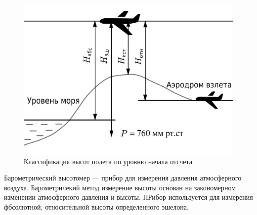 \documentclass[pract, och, master]{SCWorks}
\begin{document}
\begin{figure}[!ht]
	\centering
	\includegraphics[width=12cm]{img/baromMeasure.png}
	\caption{\label{baromMeasure}%
	Классификация высот полета по уровню начала отсчета}
\end{figure}

Барометрический высотомер --- прибор для измерения давления атмосферного воздуха. Барометричекий метод измерение высоты 
основан на закономерном изменении атмосферного давления и высоты. ПРибор используется для измерения фбсолютной, относительной высоты определенного эшелона. 








\end{document}

